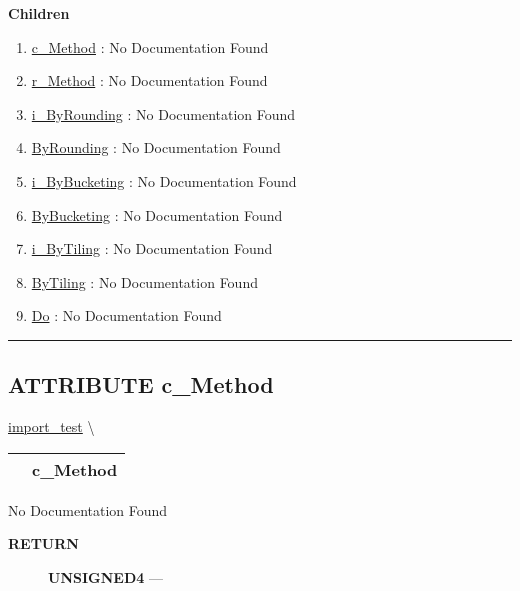 \textbf{Children}
\begin{enumerate}
\item \hyperlink{ecldoc:ecldoc-c_Method}{c\_Method}
: No Documentation Found
\item \hyperlink{ecldoc:discretize.r_method}{r\_Method}
: No Documentation Found
\item \hyperlink{ecldoc:discretize.i_byrounding}{i\_ByRounding}
: No Documentation Found
\item \hyperlink{ecldoc:discretize.byrounding}{ByRounding}
: No Documentation Found
\item \hyperlink{ecldoc:discretize.i_bybucketing}{i\_ByBucketing}
: No Documentation Found
\item \hyperlink{ecldoc:discretize.bybucketing}{ByBucketing}
: No Documentation Found
\item \hyperlink{ecldoc:discretize.i_bytiling}{i\_ByTiling}
: No Documentation Found
\item \hyperlink{ecldoc:discretize.bytiling}{ByTiling}
: No Documentation Found
\item \hyperlink{ecldoc:discretize.do}{Do}
: No Documentation Found
\end{enumerate}

\rule{\linewidth}{0.5pt}

\subsection*{\textsf{\colorbox{headtoc}{\color{white} ATTRIBUTE}
c\_Method}}

\hypertarget{ecldoc:ecldoc-c_Method}{}
\hspace{0pt} \hyperlink{ecldoc:Discretize}{import_test} \textbackslash 

{\renewcommand{\arraystretch}{1.5}
\begin{tabularx}{\textwidth}{|>{\raggedright\arraybackslash}l|X|}
\hline
\hspace{0pt}\mytexttt{\color{red} } & \textbf{c\_Method} \\
\hline
\end{tabularx}
}

\par





No Documentation Found








\par
\begin{description}
\item [\colorbox{tagtype}{\color{white} \textbf{\textsf{RETURN}}}] \textbf{UNSIGNED4} --- 
\end{description}





